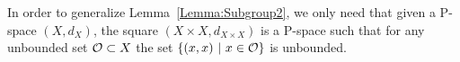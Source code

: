 %
























In order to generalize Lemma~\ref{Lemma:Subgroup2}, we only need that given a P-space $(X,d_X)$, the square $(X\times X,d_{X\times X})$ is a P-space such that for any unbounded set $\mathcal O\subset X$ the set $\{(x,x)\ |\ x\in\mathcal O\}$ is unbounded.

